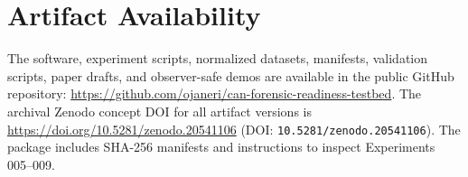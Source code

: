 \documentclass[conference]{IEEEtran}
\begin{document}
\section*{Artifact Availability}
The software, experiment scripts, normalized datasets, manifests, validation scripts, paper drafts, and observer-safe demos are available in the public GitHub repository: \url{https://github.com/ojaneri/can-forensic-readiness-testbed}. The archival Zenodo concept DOI for all artifact versions is \url{https://doi.org/10.5281/zenodo.20541106} (DOI: \texttt{10.5281/zenodo.20541106}). The package includes SHA-256 manifests and instructions to inspect Experiments 005--009.



\end{document}
